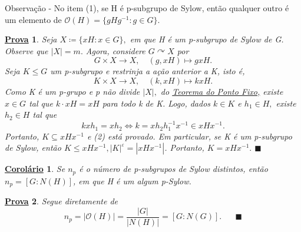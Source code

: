 \documentclass{article}
\newtheorem*{crl*}{\underline{Corol\'ario}}
\newtheorem*{proof*}{\underline{Prova}}
\renewcommand\qedsymbol{$\blacksquare$}
\begin{document}
  Observa\c cão - No item (1), se H é p-subgrupo de Sylow, então qualquer outro é um elemento de
 \(\mathcal{O}(H) = \{gHg^{-1}: g\in G\}\).
\begin{proof*}
  Seja \(X\coloneqq \{xH: x\in G\},\) em que H é um p-subgrupo de Sylow de G. Observe que
  \(|X| = m.\) Agora, considere \(G \curvearrowright X\) por 
    \[
      G\times X\rightarrow X,\quad (g, xH)\mapsto gxH.
    \]
  Seja \(K\leq G\) um p-subgrupo e restrinja a a\c cão anterior a K, isto é, 
    \[
      K\times X\rightarrow X,\quad (k, xH)\mapsto kxH.
    \]
  Como K é um p-grupo e p não divide \(|X|,\) do \hyperlink{fixed_point}{Teorema do Ponto Fixo,} existe
  \(x\in G\) tal que \(k \cdot xH = xH\) para todo k de K. Logo, dados \(k\in K\) e 
  \(h_{1}\in H,\) existe \(h_{2}\in H\) tal que 
    \[
      kxh_{1} = xh_{2} \Longleftrightarrow k = xh_{2}h_{1}^{-1}x^{-1}\in xHx^{-1}.
    \]
    Portanto, \(K\subseteq{xHx^{-1}}\) e (2) está provado. Em particular, se K é um p-subgrupo de Sylow,
    então \(K\leq xHx^{-1}, |K|^{\varepsilon } = |xHx^{-1}|\). Portanto, \(K = xHx^{-1}.\) \qedsymbol
\end{proof*}
\begin{crl*}
  Se \(n_{p}\) é o número de p-subgrupos de Sylow distintos, então \(n_{p} = [G:N(H)]\), em
que H é um algum p-Sylow.
\end{crl*}
\begin{proof*}
  Segue diretamente de 
    \[
      n_{p} = |\mathcal{O}(H)| = \frac{|G|}{|N(H)|} = [G:N(G)].\quad\text{ \qedsymbol}
    \]
\end{proof*}
\end{document}
